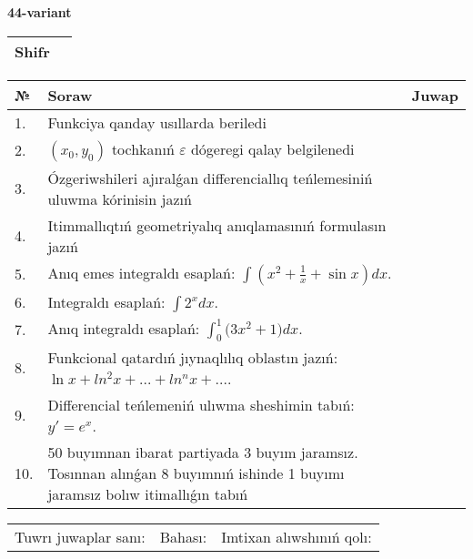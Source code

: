 \documentclass{article}
\begin{document}
  \egroup
  
  \newpage
  
  
  \textbf{44-variant}\\
  
  \bgroup
  \def\arraystretch{1.6} %
  
  \begin{tabular}{|m{5.7cm}|m{9.5cm}|}
  \hline
  Shifr & \\
  \hline
  \end{tabular}
  
  \vspace{1cm}
  
  \begin{tabular}{|m{0.7cm}|m{10cm}|m{4cm}|}
  \hline
  № & Soraw & Juwap \\
  \hline
  1. & Funkciya qanday usıllarda beriledi &  \\
  \hline
  2. & \((x_0,y_0)\) tochkanıń \(\varepsilon\) dógeregi qalay belgilenedi &  \\
  \hline
  3. & Ózgeriwshileri ajıralǵan differenciallıq teńlemesiniń uluwma kórinisin jazıń &  \\
  \hline
  4. & Itimmallıqtıń geometriyalıq anıqlamasınıń formulasın jazıń &  \\
  \hline
  5. & Anıq emes integraldı esaplań: \(\int{\left( x^2  + \frac{1}{x} + \sin x \right)dx}\). &  \\
  \hline
  6. & Integraldı esaplań: \(\int{2^{x}dx}\). &  \\
  \hline
  7. & Anıq integraldı esaplań: \(\int_{0}^{1}{(3x^2 } + 1)dx\). &  \\
  \hline
  8. & Funkcional qatardıń jıynaqlılıq oblastın jazıń: \(\ln x + ln^2 x + ... + ln^{n}x + ...\). &  \\
  \hline
  9. & Differencial teńlemeniń ulıwma sheshimin tabıń: \(y' = e^{x}\). &  \\
  \hline
  10. & 50 buyımnan ibarat partiyada 3 buyım jaramsız. Tosınnan alınǵan 8 buyımnıń ishinde 1 buyımı jaramsız bolıw itimallıǵın tabıń &  \\
  \hline
  \end{tabular}
  
  \vspace{1cm}
  
  \begin{tabular}{lll}
  Tuwrı juwaplar sanı: \underline{\hspace{1.5cm}} & 
  Bahası: \underline{\hspace{1.5cm}} & 
  Imtixan alıwshınıń qolı: \underline{\hspace{2cm}} \\
  \end{tabular}
  
\end{document}
